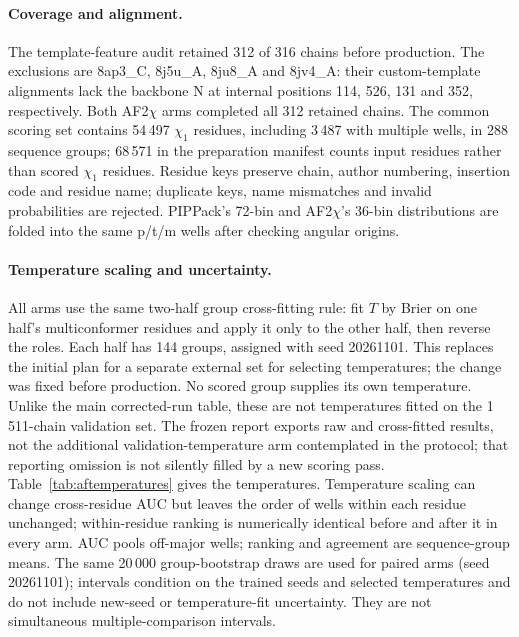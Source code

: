 \documentclass[10pt,a4paper]{article}
\begin{document}
\paragraph{Coverage and alignment.} The template-feature audit retained 312 of 316
chains before production. The exclusions are 8ap3\_C, 8j5u\_A, 8ju8\_A and 8jv4\_A:
their custom-template alignments lack the backbone N at internal positions 114, 526,
131 and 352, respectively. Both AF2$\chi$ arms completed all 312 retained chains.
The common scoring set contains 54\,497 $\chi_1$ residues, including 3\,487 with
multiple wells, in 288 sequence groups; 68\,571 in the preparation manifest counts
input residues rather than scored $\chi_1$ residues. Residue keys preserve chain,
author numbering, insertion code and residue name; duplicate keys, name mismatches
and invalid probabilities are rejected. PIPPack's 72-bin and AF2$\chi$'s 36-bin
distributions are folded into the same p/t/m wells after checking angular origins.

\paragraph{Temperature scaling and uncertainty.} All arms use the same two-half group
cross-fitting rule: fit $T$ by Brier on one half's multiconformer residues and apply it
only to the other half, then reverse the roles. Each half has 144 groups, assigned
with seed 20261101. This replaces the initial plan for a separate external set for selecting temperatures; the change was fixed before production. No scored group supplies its own
temperature. Unlike the main corrected-run table, these are not temperatures fitted
on the 1\,511-chain validation set. The frozen report exports raw and cross-fitted
results, not the additional validation-temperature arm contemplated in the protocol;
that reporting omission is not silently filled by a new scoring pass. Table~\ref{tab:aftemperatures}
gives the temperatures. Temperature scaling can change cross-residue AUC but leaves the order
of wells within each residue unchanged; within-residue ranking is numerically identical
before and after it in every arm. AUC pools off-major wells; ranking and agreement
are sequence-group means. The same 20\,000 group-bootstrap draws are used for paired
arms (seed 20261101); intervals condition on the trained seeds and selected temperatures and do not include new-seed or temperature-fit uncertainty. They are not simultaneous
multiple-comparison intervals.
\end{document}
